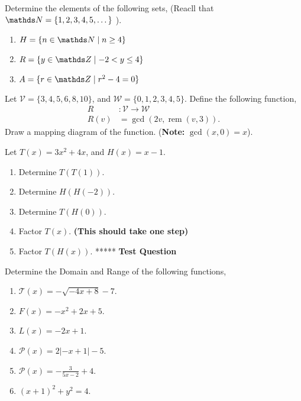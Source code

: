\documentclass[12pt]{article} %
\begin{document}
\begin{qstn}
  Determine the elements of the following sets, (Reacll that $\N = \{1,2,3,4,5,\dots\} $ ).
  \begin{enumerate}[label=(\alph*)]
    \item $H = \{n \in \N \mid n \geq 4\} $
    \item $R = \{y \in \Z \mid -2 < y \leq 4\}  $
    \item $A = \{r \in \Z \mid r^2 - 4 = 0\} $
  \end{enumerate}
\end{qstn}


\begin{qstn}
  Let $\mathcal{V} = \{3,4,5,6,8,10\}$, and $\mathcal{W} = \{0,1,2,3,4,5\} $. Define the following function,
  \begin{align*}
    R &\colon \mathcal{V} \rightarrow \mathcal{W}\\
    R(v) &= \gcd \left(2v, \operatorname{rem}(v,3)\right)
  .\end{align*}
  Draw a mapping diagram of the function. (\textbf{Note:} $\gcd(x,0) = x$).
\end{qstn}

\begin{qstn}
  Let $T(x) = 3x^2 + 4x$, and $H(x) = x - 1$.
  \begin{enumerate}[label=(\alph*)]
    \item Determine $T(T(1))$.
    \item Determine $H(H(-2))$.
    \item Determine $T(H(0))$.
    \item Factor $T(x)$. \textbf{(This should take one step)}
    \item Factor $T(H(x))$. ***** \textbf{Test Question}
  \end{enumerate}

\end{qstn}

\begin{qstn}
  Determine the Domain and Range of the following functions,
  \begin{enumerate}[label=(\alph*)]
    \item $\mathcal{T}(x) = -\sqrt{-4x + 8} - 7 $.
    \item $F(x) = -x^2+2x+5$.
    \item $L(x) = -2x + 1$.
    \item $\mathcal{P}(x) = 2|-x + 1| - 5$.
    \item $\mathcal{P}(x) = -\frac{3}{5x - 2} + 4$.
    \item $(x + 1)^2 + y^2 = 4$.
  \end{enumerate}
\end{qstn}
\end{document}
